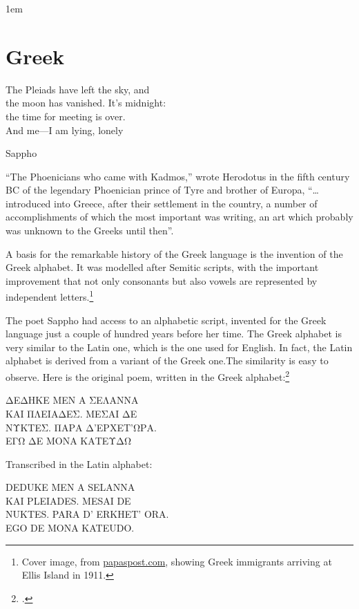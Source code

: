 
\parindent1em

\chapter{Greek}
\epigraph{The Pleiads have left the sky, and\\
the moon has vanished. It’s midnight:\\
the time for meeting is over.\\
And me—I am lying, lonely}{Sappho}
\label{s:greek}



\enquote{The Phoenicians who came with Kadmos,} wrote Herodotus in the fifth century BC of the legendary Phoenician prince of Tyre and brother of Europa, ``\ldots introduced into Greece, after their settlement in the country, a number of accomplishments of which the most important was writing, an art which probably was unknown to the Greeks until then''. 

A basis for the remarkable history of the Greek language is
the invention of the Greek alphabet. It was modelled after
Semitic scripts, with the important improvement that not only
consonants but also vowels are represented by independent
letters.\footnote{Cover image, from \href{http://www.pappaspost.com/todays-undesirable-muslims-were-yesteryears-greeks-pure-american-no-rats-no-greeks/}{papaspost.com}, showing Greek immigrants arriving at Ellis Island in 1911.}

The poet Sappho had access to an alphabetic script, invented
for the Greek language just a couple of hundred years before her
time. The Greek alphabet is very similar to the Latin one, which
is the one used for English. In fact, the Latin alphabet is derived
from a variant of the Greek one.The similarity is easy to observe.
Here is the original poem, written in the Greek alphabet:\footcite{janson:2002}


\begin{center}
\arial 
ΔΕΔΗΚΕ ΜΕΝ Α ΣΕΛΑΝΝΑ\\
ΚΑΙ ΠΛΕΙΑΔΕΣ. ΜΕΣΑΙ ΔΕ\\
ΝΥΚΤΕΣ. ΠΑΡΑ Δ'ΕΡΧΕΤ'ΩΡΑ.\\
ΕΓΩ ΔΕ ΜΟΝΑ ΚΑΤΕΥΔΩ\\
\end{center} 

Transcribed in the Latin alphabet:

\begin{center}
DEDUKE MEN A SELANNA\\
KAI PLEIADES. MESAI DE\\
NUKTES. PARA D’ ERKHET’ ORA.\\
EGO DE MONA KATEUDO.\\
\end{center}

